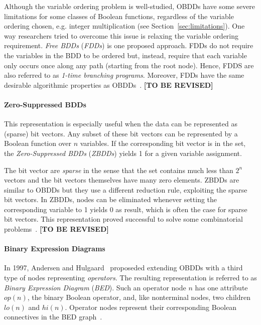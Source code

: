 \documentclass{vldb}
\newcommand{\tbr}{\textbf{[TO BE REVISED]}}
\begin{document}
Although the variable ordering problem is well-studied, OBDDs have some severe
limitations for some classes of Boolean functions, regardless of the variable
ordering chosen, e.g. integer multiplication (see Section~\ref{sec:limitations}).
One way researchers tried to overcome this issue is relaxing the variable ordering
requirement. \textit{Free BDDs} (\textit{FDDs}) is one proposed approach. FDDs
do not require the variables in the BDD to be ordered but, instead, require that
each variable only occurs once along any path (starting from the root node).
Hence, FDDS are also referred to as \textit{1-time branching programs}. Moreover,
FDDs have the same desirable algorithmic properties as OBDDs~\cite{BRYANT95}. \tbr

\paragraph*{Zero-Suppressed BDDs}
\mbox{} %

This representation is especially useful when the data can be represented as
(sparse) bit vectors. Any subset of these bit vectors can be represented by a
Boolean function over $n$ variables. If the corresponding bit vector is in the
set, the \textit{Zero-Suppressed BDDs} (\textit{ZBDDs}) yields 1 for a given
variable assignment.

The bit vector are \textit{sparse} in the sense that the set contains much less
than $2^n$ vectors and the bit vectors themselves have many zero elements. ZBDDs
are similar to OBDDs but they use a different reduction rule, exploiting the
sparse bit vectors. In ZBDDs, nodes can be eliminated whenever setting the
corresponding variable to 1 yields 0 as result, which is often the case for sparse
bit vectors. This representation proved successful to solve some combinatorial
problems~\cite{BRYANT95}. \tbr %

\paragraph*{Binary Expression Diagrams}
\mbox{} %

In 1997, Andersen and Hulgaard~\cite{ANDERSEN97} proposeded extending OBDDs with
a third type of nodes representing \textit{operators}. The resulting
representation is referred to as \textit{Binary Expression Diagram}
(\textit{BED}). Such an operator node $n$ has one attribute $op(n)$, the binary
Boolean operator, and, like nonterminal nodes, two children $lo(n)$ and $hi(n)$.
Operator nodes represent their corresponding Boolean connectives in the BED
graph~\cite{ANDERSEN97}.
\end{document}
